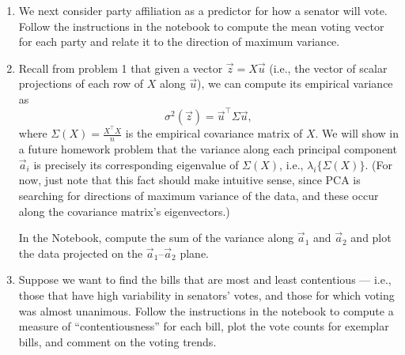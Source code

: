 \documentclass[10pt]{article}
\theoremstyle{definition}
\theoremstyle{plain}
\begin{document}
\begin{enumerate}[label=(\alph*)]
Note that this variance is therefore a function of the ``centered'' data matrix $X - \vec{1}\vec{\mu}(X)^\top$ in which the mean of each column is zero. It also does not depend on $b$.

For the remainder of this problem, we assume that the data has been pre-centered (i.e., $\vec{\mu}(X) = \vec{0}$); note that this has been pre-computed for you in the code notebook. Assume also that $b = 0$, so that $\mu(\vec{z}) = 0$.

Defining $f(X, \vec{a}) \doteq f(X, \vec{a}, 0)$ and replacing $\vec{z}$ with $f(X, \vec{a})$, we can then write the simpler empirical variance formula
\begin{equation}
\sigma^2(f(X, \vec{a})) = \frac{1}{n}\vec{a}^\top X^\top X \vec{a}.
\end{equation}

Suppose we restrict $\vec{a}$ to have unit-norm. In the provided code, find the maximum empirical variance $\sigma^2(f(X, \vec{a}))$ over all unit-norm $\vec{a}$, and find the $\vec{a}$ that maximizes it.

\item We next consider party affiliation as a predictor for how a senator will vote. Follow the instructions in the notebook to compute the mean voting vector for each party and relate it to the direction of maximum variance.

\item Recall from problem 1 that given a vector $\vec{z} = X\vec{u}$ (i.e., the vector of scalar projections of each row of $X$ along $\vec{u}$), we can compute its empirical variance as
\begin{equation}
\sigma^2(\vec{z}) = \vec{u}^\top \Sigma \vec{u},
\end{equation}
where $\Sigma(X) = \frac{X^\top X}{n}$ is the empirical covariance matrix of $X$. We will show in a future homework problem that the variance along each principal component $\vec{a}_i$ is precisely its corresponding eigenvalue of $\Sigma(X)$, i.e., $\lambda_i\{\Sigma(X)\}$. (For now, just note that this fact should make intuitive sense, since PCA is searching for directions of maximum variance of the data, and these occur along the covariance matrix's eigenvectors.)

In the Notebook, compute the sum of the variance along $\vec{a}_1$ and $\vec{a}_2$ and plot the data projected on the $\vec{a}_1$--$\vec{a}_2$ plane.

\item Suppose we want to find the bills that are most and least contentious --- i.e., those that have high variability in senators' votes, and those for which voting was almost unanimous. Follow the instructions in the notebook to compute a measure of ``contentiousness'' for each bill, plot the vote counts for exemplar bills, and comment on the voting trends.


\end{enumerate}
\end{document}
